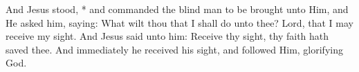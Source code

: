 And Jesus stood, * and commanded the blind man to be brought unto Him, and He asked him, saying: What wilt thou that I shall do unto thee? Lord, that I may receive my sight. And Jesus said unto him: Receive thy sight, thy faith hath saved thee. And immediately he received his sight, and followed Him, glorifying God.